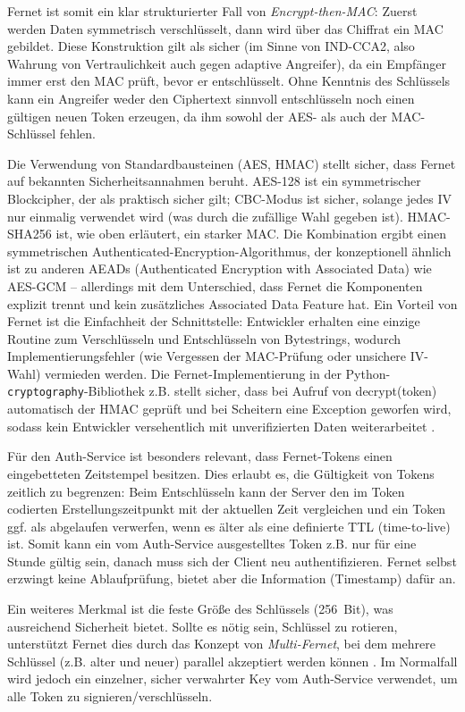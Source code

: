 Fernet ist somit ein klar strukturierter Fall von \textit{Encrypt-then-MAC}: Zuerst werden Daten symmetrisch verschlüsselt, dann wird über das Chiffrat ein MAC gebildet. Diese Konstruktion gilt als sicher (im Sinne von IND-CCA2, also Wahrung von Vertraulichkeit auch gegen adaptive Angreifer), da ein Empfänger immer erst den MAC prüft, bevor er entschlüsselt. Ohne Kenntnis des Schlüssels kann ein Angreifer weder den Ciphertext sinnvoll entschlüsseln noch einen gültigen neuen Token erzeugen, da ihm sowohl der AES- als auch der MAC-Schlüssel fehlen.

Die Verwendung von Standardbausteinen (AES, HMAC) stellt sicher, dass Fernet auf bekannten Sicherheitsannahmen beruht. AES-128 ist ein symmetrischer Blockcipher, der als praktisch sicher gilt; CBC-Modus ist sicher, solange jedes IV nur einmalig verwendet wird (was durch die zufällige Wahl gegeben ist). HMAC-SHA256 ist, wie oben erläutert, ein starker MAC. Die Kombination ergibt einen symmetrischen Authenticated-Encryption-Algorithmus, der konzeptionell ähnlich ist zu anderen AEADs (Authenticated Encryption with Associated Data) wie AES-GCM – allerdings mit dem Unterschied, dass Fernet die Komponenten explizit trennt und kein zusätzliches Associated Data Feature hat. Ein Vorteil von Fernet ist die Einfachheit der Schnittstelle: Entwickler erhalten eine einzige Routine zum Verschlüsseln und Entschlüsseln von Bytestrings, wodurch Implementierungsfehler (wie Vergessen der MAC-Prüfung oder unsichere IV-Wahl) vermieden werden. Die Fernet-Implementierung in der Python-\texttt{cryptography}-Bibliothek z.B. stellt sicher, dass bei Aufruf von decrypt(token) automatisch der HMAC geprüft und bei Scheitern eine Exception geworfen wird, sodass kein Entwickler versehentlich mit unverifizierten Daten weiterarbeitet \cite{cryptographyFernet}.

Für den Auth-Service ist besonders relevant, dass Fernet-Tokens einen eingebetteten Zeitstempel besitzen. Dies erlaubt es, die Gültigkeit von Tokens zeitlich zu begrenzen: Beim Entschlüsseln kann der Server den im Token codierten Erstellungszeitpunkt mit der aktuellen Zeit vergleichen und ein Token ggf. als abgelaufen verwerfen, wenn es älter als eine definierte TTL (time-to-live) ist. Somit kann ein vom Auth-Service ausgestelltes Token z.B. nur für eine Stunde gültig sein, danach muss sich der Client neu authentifizieren. Fernet selbst erzwingt keine Ablaufprüfung, bietet aber die Information (Timestamp) dafür an.

Ein weiteres Merkmal ist die feste Größe des Schlüssels (256 Bit), was ausreichend Sicherheit bietet. Sollte es nötig sein, Schlüssel zu rotieren, unterstützt Fernet dies durch das Konzept von \textit{Multi-Fernet}, bei dem mehrere Schlüssel (z.B. alter und neuer) parallel akzeptiert werden können \cite{cryptographyFernet}. Im Normalfall wird jedoch ein einzelner, sicher verwahrter Key vom Auth-Service verwendet, um alle Token zu signieren/verschlüsseln.

